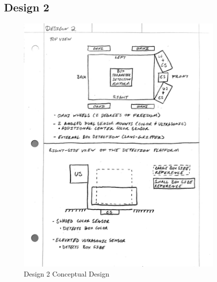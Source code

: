 \documentclass[12pt]{report}
\begin{document}
\subsection{Design 2}
\begin{figure}[H]
    \centering
    \includegraphics[width=0.9\textwidth]{Images/Designs/Design2.pdf}
    \caption{Design 2 Conceptual Design}
    \label{fig:design2}
\end{figure}
\end{document}
